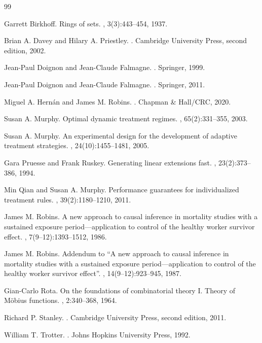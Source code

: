 \documentclass{article}
\theoremstyle{definition}
\begin{document}
\begin{thebibliography}{99}\setlength{\itemsep}{0.2em}

Garrett Birkhoff.
\newblock Rings of sets.
, 3(3):443--454, 1937.

Brian A. Davey and Hilary A. Priestley.
.
\newblock Cambridge University Press, second edition, 2002.

Jean-Paul Doignon and Jean-Claude Falmagne.
.
\newblock Springer, 1999.

Jean-Paul Doignon and Jean-Claude Falmagne.
.
\newblock Springer, 2011.

Miguel A. Hern\'an and James M. Robins.
.
\newblock Chapman \& Hall/CRC, 2020.

Susan A. Murphy.
\newblock Optimal dynamic treatment regimes.
, 65(2):331--355, 2003.

Susan A. Murphy.
\newblock An experimental design for the development of adaptive treatment strategies.
, 24(10):1455--1481, 2005.

Gara Pruesse and Frank Ruskey.
\newblock Generating linear extensions fast.
, 23(2):373--386, 1994.

Min Qian and Susan A. Murphy.
\newblock Performance guarantees for individualized treatment rules.
, 39(2):1180--1210, 2011.

James M. Robins.
\newblock A new approach to causal inference in mortality studies with a sustained exposure period---application to control of the healthy worker survivor effect.
, 7(9--12):1393--1512, 1986.

James M. Robins.
\newblock Addendum to ``A new approach to causal inference in mortality studies with a sustained exposure period---application to control of the healthy worker survivor effect''.
, 14(9--12):923--945, 1987.

Gian-Carlo Rota.
\newblock On the foundations of combinatorial theory I. Theory of M\"obius functions.
, 2:340--368, 1964.

Richard P. Stanley.
.
\newblock Cambridge University Press, second edition, 2011.

William T. Trotter.
.
\newblock Johns Hopkins University Press, 1992.

\end{thebibliography}
\end{document}
